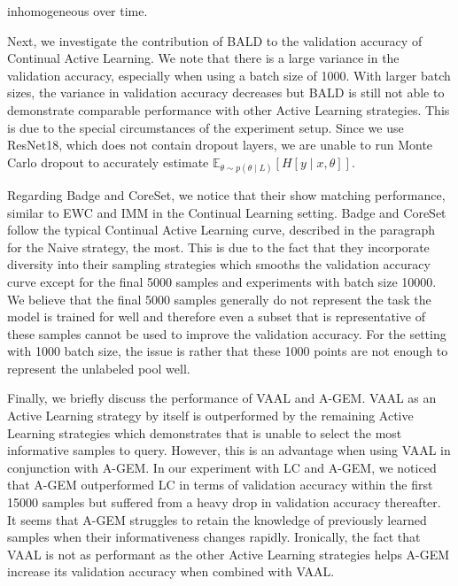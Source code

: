 inhomogeneous over time. \par
Next, we investigate the contribution of BALD to the validation accuracy of Continual Active Learning. We note that there is a large variance in the validation accuracy, especially when using a batch size of 1000. With larger batch sizes, the variance in validation accuracy decreases
but BALD is still not able to demonstrate comparable performance with other Active Learning strategies. This is due to the special circumstances of the experiment setup. Since we use ResNet18, which does not contain dropout layers, we are unable to run Monte Carlo dropout to accurately
estimate $\mathbb{E}_{\theta \sim p(\theta \mid L)} [H[y \mid x, \theta]]$. \par
Regarding Badge and CoreSet, we notice that their show matching performance, similar to EWC and IMM in the Continual Learning setting. Badge and CoreSet follow the typical Continual Active Learning curve, described in the paragraph for the Naive strategy, the most. This is due to the
fact that they incorporate diversity into their sampling strategies which smooths the validation accuracy curve except for the final 5000 samples and experiments with batch size 10000. We believe that the final 5000 samples generally do not represent the task the model is trained for
well and therefore even a subset that is representative of these samples cannot be used to improve the validation accuracy. For the setting with 1000 batch size, the issue is rather that these 1000 points are not enough to represent the unlabeled pool well. \par
Finally, we briefly discuss the performance of VAAL and A-GEM. VAAL as an Active Learning strategy by itself is outperformed by the remaining Active Learning strategies which demonstrates that is unable to select the most informative samples to query. However, this is an advantage when
using VAAL in conjunction with A-GEM. In our experiment with LC and A-GEM, we noticed that A-GEM outperformed LC in terms of validation accuracy within the first 15000 samples but suffered from a heavy drop in validation accuracy thereafter. It seems that A-GEM struggles to retain the
knowledge of previously learned samples when their informativeness changes rapidly. Ironically, the fact that VAAL is not as performant as the other Active Learning strategies helps A-GEM increase its validation accuracy when combined with VAAL. \par

